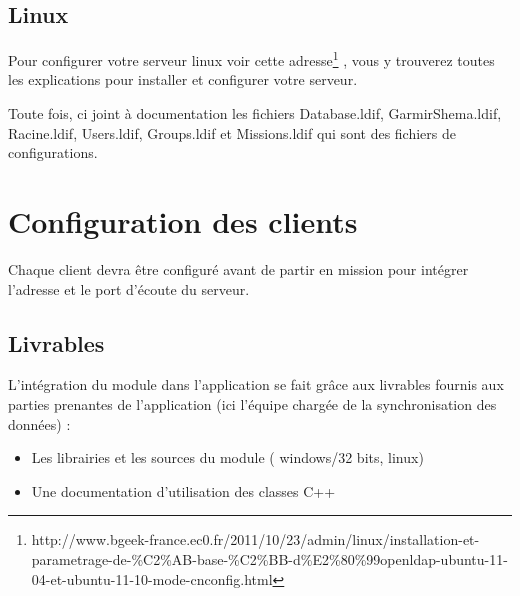 \subsection{Linux}
Pour configurer votre serveur linux voir cette adresse\footnote{http://www.bgeek-france.ec0.fr/2011/10/23/admin/linux/installation-et-parametrage-de-\%C2\%AB-base-\%C2\%BB-d\%E2\%80\%99openldap-ubuntu-11-04-et-ubuntu-11-10-mode-cnconfig.html }
, vous y trouverez toutes les explications pour installer et configurer votre serveur.

Toute fois, ci joint à documentation les fichiers Database.ldif, GarmirShema.ldif, Racine.ldif, Users.ldif, Groups.ldif et Missions.ldif qui sont des fichiers de configurations.
\section{Configuration des clients}
Chaque client devra être configuré avant de partir en mission pour intégrer l’adresse et le port d’écoute du serveur. 

\subsection{Livrables}
L’intégration du module dans l’application se fait grâce aux livrables fournis aux parties prenantes de l’application (ici l’équipe chargée de la synchronisation des données) :
\begin{itemize}
\item Les librairies et les sources du module ( windows/32 bits, linux)
\item Une documentation d’utilisation des classes C++
\end{itemize}
